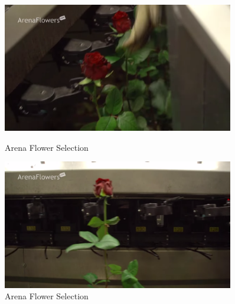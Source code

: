 \documentclass{article}
\begin{document}
\begin{figure}[ht]
\centering
\includegraphics[width=0.9\textwidth]{images/arena-flower-selection.png}
\caption{Arena Flower Selection}

\includegraphics[width=0.9\textwidth]{images/arena-flower-selection-1.png}
\caption{Arena Flower Selection}
\end{figure}
\end{document}
